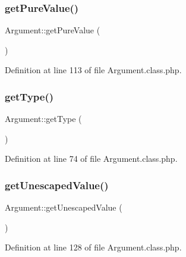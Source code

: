 \mbox{\label{classArgument_a54140067b590d8ce8dcd7d09f56519cd}} 
\subsubsection{\texorpdfstring{get\+Pure\+Value()}{getPureValue()}}
{\footnotesize\ttfamily Argument\+::get\+Pure\+Value (\begin{DoxyParamCaption}{ }\end{DoxyParamCaption})}



Definition at line 113 of file Argument.\+class.\+php.

\mbox{\label{classArgument_a62ea3d6e7689c8a40f6f9722e76fa7a8}} 
\subsubsection{\texorpdfstring{get\+Type()}{getType()}}
{\footnotesize\ttfamily Argument\+::get\+Type (\begin{DoxyParamCaption}{ }\end{DoxyParamCaption})}



Definition at line 74 of file Argument.\+class.\+php.

\mbox{\label{classArgument_a45a70c173c816e9cf2c7c5f396a92a6f}} 
\subsubsection{\texorpdfstring{get\+Unescaped\+Value()}{getUnescapedValue()}}
{\footnotesize\ttfamily Argument\+::get\+Unescaped\+Value (\begin{DoxyParamCaption}{ }\end{DoxyParamCaption})}



Definition at line 128 of file Argument.\+class.\+php.

\mbox{\label{classArgument_a53b70d0071096047437015737d5d7728}} 
